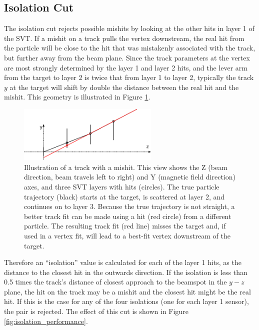 \subsection{Isolation Cut}
The isolation cut rejects possible mishits by looking at the other hits in layer 1 of the SVT.
If a mishit on a track pulls the vertex downstream, the real hit from the particle will be close to the hit that was mistakenly associated with the track, but further away from the beam plane.
Since the track parameters at the vertex are most strongly determined by the layer 1 and layer 2 hits, and the lever arm from the target to layer 2 is twice that from layer 1 to layer 2, typically the track $y$ at the target will shift by double the distance between the real hit and the mishit.
This geometry is illustrated in Figure \ref{fig:isolation_schematic}.

\begin{figure}[ht]
\begin{center}
    \includegraphics[width=0.6\textwidth]{vertexing/figs/isolation}
\end{center}
    \caption{Illustration of a track with a mishit.
    This view shows the Z (beam direction, beam travels left to right) and Y (magnetic field direction) axes, and three SVT layers with hits (circles).
    The true particle trajectory (black) starts at the target, is scattered at layer 2, and continues on to layer 3.
    Because the true trajectory is not straight, a better track fit can be made using a hit (red circle) from a different particle.
    The resulting track fit (red line) misses the target and, if used in a vertex fit, will lead to a best-fit vertex downstream of the target.
    }
    \label{fig:isolation_schematic}
\end{figure}

Therefore an ``isolation'' value is calculated for each of the layer 1 hits, as the distance to the closest hit in the outwards direction.
If the isolation is less than 0.5 times the track's distance of closest approach to the beamspot in the $y-z$ plane, the hit on the track may be a mishit and the closest hit might be the real hit.
If this is the case for any of the four isolations (one for each layer 1 sensor), the pair is rejected.
The effect of this cut is shown in Figure \ref{fig:isolation_performance}.

